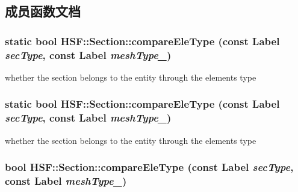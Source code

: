 \subsection{成员函数文档}
\hypertarget{classHSF_1_1Section_af17737c4ca44540770552c8790f40897}{
\subsubsection[{compareEleType}]{\setlength{\rightskip}{0pt plus 5cm}static bool HSF::Section::compareEleType (const {\bf Label} {\em secType}, \/  const {\bf Label} {\em meshType\_\-})}}
\label{classHSF_1_1Section_af17737c4ca44540770552c8790f40897}


whether the section belongs to the entity through the elements type \hypertarget{classHSF_1_1Section_af17737c4ca44540770552c8790f40897}{
\subsubsection[{compareEleType}]{\setlength{\rightskip}{0pt plus 5cm}static bool HSF::Section::compareEleType (const {\bf Label} {\em secType}, \/  const {\bf Label} {\em meshType\_\-})}}
\label{classHSF_1_1Section_af17737c4ca44540770552c8790f40897}


whether the section belongs to the entity through the elements type \hypertarget{classHSF_1_1Section_ab980393a237c4f886589726f45b34803}{
\subsubsection[{compareEleType}]{\setlength{\rightskip}{0pt plus 5cm}bool HSF::Section::compareEleType (const {\bf Label} {\em secType}, \/  const {\bf Label} {\em meshType\_\-})}}
\label{classHSF_1_1Section_ab980393a237c4f886589726f45b34803}


